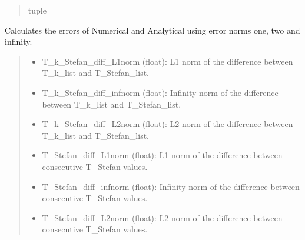 \documentclass[a4paper,11pt,english,openany]{sphinxmanual}
\begin{document}
\begin{fulllineitems}
\begin{fulllineitems}
\begin{quote}
\begin{description}
\sphinxAtStartPar
tuple

\end{description}\end{quote}

\end{fulllineitems}


\begin{fulllineitems}
\label{\detokenize{api/spyice.postprocess.analysis:src.spyice.postprocess.analysis.Analysis.error_analytical_numerical}}
\pysigstartsignatures
\pysiglinewithargsret
{}
{}
{}
\pysigstopsignatures
\sphinxAtStartPar
Calculates the errors of Numerical and Analytical using error norms one, two and infinity.
\begin{quote}\begin{description}
\sphinxAtStartPar
{}

\sphinxAtStartPar
\begin{description}
\begin{itemize}
\item {} 
\sphinxAtStartPar
T\_k\_Stefan\_diff\_L1norm (float): L1 norm of the difference between T\_k\_list and T\_Stefan\_list.

\item {} 
\sphinxAtStartPar
T\_k\_Stefan\_diff\_infnorm (float): Infinity norm of the difference between T\_k\_list and T\_Stefan\_list.

\item {} 
\sphinxAtStartPar
T\_k\_Stefan\_diff\_L2norm (float): L2 norm of the difference between T\_k\_list and T\_Stefan\_list.

\item {} 
\sphinxAtStartPar
T\_Stefan\_diff\_L1norm (float): L1 norm of the difference between consecutive T\_Stefan values.

\item {} 
\sphinxAtStartPar
T\_Stefan\_diff\_infnorm (float): Infinity norm of the difference between consecutive T\_Stefan values.

\item {} 
\sphinxAtStartPar
T\_Stefan\_diff\_L2norm (float): L2 norm of the difference between consecutive T\_Stefan values.


\end{itemize}
\end{description}
\end{description}
\end{quote}
\end{fulllineitems}
\end{fulllineitems}
\end{document}
